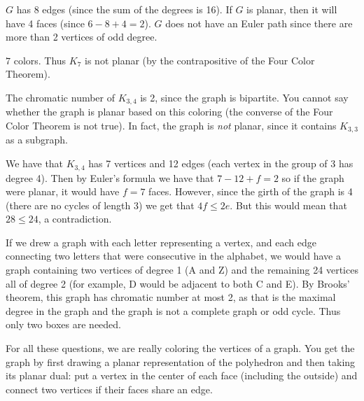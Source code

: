 \protect \documentclass [10pt]{exam}
\renewenvironment{Ans}[1]{\setcounter{question}{#1}\addtocounter{question}{-1}\question }{}
\begin{document}
\begin{questions}
\begin{Ans}{10}
\end{Ans}
\begin{Ans}{11}
  $G$ has 8 edges (since the sum of the degrees is 16).  If $G$ is planar, then it will have 4 faces (since $6 - 8 + 4 = 2$).  $G$ does not have an Euler path since there are more than 2 vertices of odd degree.
  
\end{Ans}
\begin{Ans}{12}
  $7$ colors.  Thus $K_7$ is not planar (by the contrapositive of the Four Color Theorem).
  
\end{Ans}
\begin{Ans}{13}
  The chromatic number of $K_{3,4}$ is 2, since the graph is bipartite.  You cannot say whether the graph is planar based on this coloring (the converse of the Four Color Theorem is not true).  In fact, the graph is {\em not} planar, since it contains $K_{3,3}$ as a subgraph.
  
\end{Ans}
\begin{Ans}{14}
		We have that $K_{3,4}$ has 7 vertices and 12 edges (each vertex in the group of 3 has degree 4).  Then by Euler's formula we have that $7 - 12 + f = 2$ so if the graph were planar, it would have $f = 7$ faces.  However, since the girth of the graph is 4 (there are no cycles of length 3) we get that $4f \le 2e$.  But this would mean that $28 \le 24$, a contradiction.
	
\end{Ans}
\begin{Ans}{15}
	If we drew a graph with each letter representing a vertex, and each edge connecting two letters that were consecutive in the alphabet, we would have a graph containing two vertices of degree 1 (A and Z) and the remaining 24 vertices all of degree 2 (for example, D would be adjacent to both C and E). By Brooks' theorem, this graph has chromatic number at most 2, as that is the maximal degree in the graph and the graph is not a complete graph or odd cycle. Thus only two boxes are needed.
\end{Ans}
\begin{Ans}{16}
		For all these questions, we are really coloring the vertices of a graph.  You get the graph by first drawing a planar representation of the polyhedron and then taking its planar dual: put a vertex in the center of each face (including the outside) and connect two vertices if their faces share an edge.
		\begin{parts}

\end{parts}
\end{Ans}
\end{questions}
\end{document}
